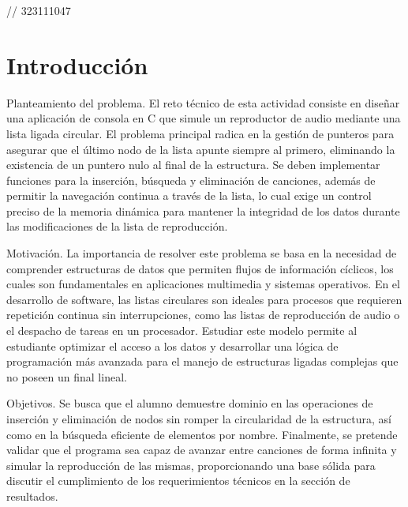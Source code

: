 // 323111047

\section{Introducción}

Planteamiento del problema. El reto técnico de esta actividad consiste en diseñar una aplicación de consola en C que simule un reproductor de audio mediante una lista ligada circular. El problema principal radica en la gestión de punteros para asegurar que el último nodo de la lista apunte siempre al primero, eliminando la existencia de un puntero nulo al final de la estructura. Se deben implementar funciones para la inserción, búsqueda y eliminación de canciones, además de permitir la navegación continua a través de la lista, lo cual exige un control preciso de la memoria dinámica para mantener la integridad de los datos durante las modificaciones de la lista de reproducción.

\vspace{0.4cm}

Motivación. La importancia de resolver este problema se basa en la necesidad de comprender estructuras de datos que permiten flujos de información cíclicos, los cuales son fundamentales en aplicaciones multimedia y sistemas operativos. En el desarrollo de software, las listas circulares son ideales para procesos que requieren repetición continua sin interrupciones, como las listas de reproducción de audio o el despacho de tareas en un procesador. Estudiar este modelo permite al estudiante optimizar el acceso a los datos y desarrollar una lógica de programación más avanzada para el manejo de estructuras ligadas complejas que no poseen un final lineal.

\vspace{0.4cm}

Objetivos. Se busca que el alumno demuestre dominio en las operaciones de inserción y eliminación de nodos sin romper la circularidad de la estructura, así como en la búsqueda eficiente de elementos por nombre. Finalmente, se pretende validar que el programa sea capaz de avanzar entre canciones de forma infinita y simular la reproducción de las mismas, proporcionando una base sólida para discutir el cumplimiento de los requerimientos técnicos en la sección de resultados.
